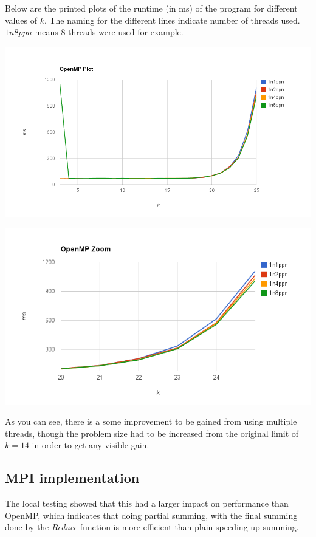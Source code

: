 \documentclass[fontsize=11pt,paper=a4,titlepage]{report}
\begin{document}
Below are the printed plots of the runtime (in ms) of the program for different
values of $k$. The naming for the different lines indicate number of threads used.
$1n8ppn$ means 8 threads were used for example.

\begin{center}
	\includegraphics[scale=0.4]{chart_1.png}
\end{center}

\begin{center}
	\includegraphics[scale=0.5]{chart_2.png}
\end{center}

As you can see, there is a some improvement to be gained from using multiple
threads, though the problem size had to be increased from the original limit of
$k = 14$ in order to get any visible gain.

\subsection{MPI implementation}

The local testing showed that this had a larger impact on performance than
OpenMP, which indicates that doing partial summing, with the final summing done
by the \textit{Reduce} function is more efficient than plain speeding up summing.
\end{document}
